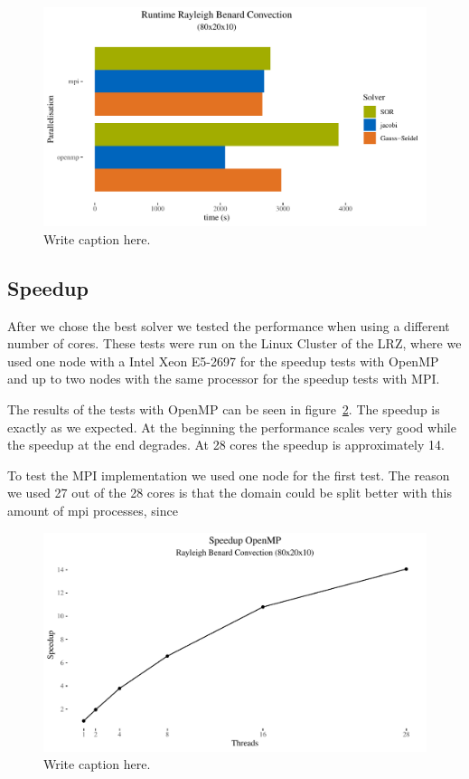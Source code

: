 \documentclass{article}%
\begin{document}
\begin{figure}[htb]
\centering
\includegraphics[width=1\linewidth]{../tests/graphs/runtime_rayleigh_benard_convection_8-2-1_solver.pdf}
\caption{Write caption here.}
\label{fig:solver}
\end{figure}


\subsection{Speedup}
After we chose the best solver we tested the performance when using a different number of cores. These tests were run on the Linux Cluster of the LRZ, where we used one node with a Intel Xeon E5-2697 for the speedup tests with OpenMP and up to two nodes with the same processor for the speedup tests with MPI.

The results of the tests with OpenMP can be seen in figure~\ref{fig:speedup_openmp}. The speedup is exactly as we expected. At the beginning the performance scales very good while the speedup at the end degrades. At 28 cores the speedup is approximately 14.

To test the MPI implementation we used one node for the first test. The reason we used 27 out of the 28 cores is that the domain could be split better with this amount of mpi processes, since 


\begin{figure}[htb]
\centering
\includegraphics[width=1\linewidth]{../tests/graphs/speedup_OpenMP_double.pdf}
\caption{Write caption here.}
\label{fig:speedup_openmp}
\end{figure}
\end{document}
